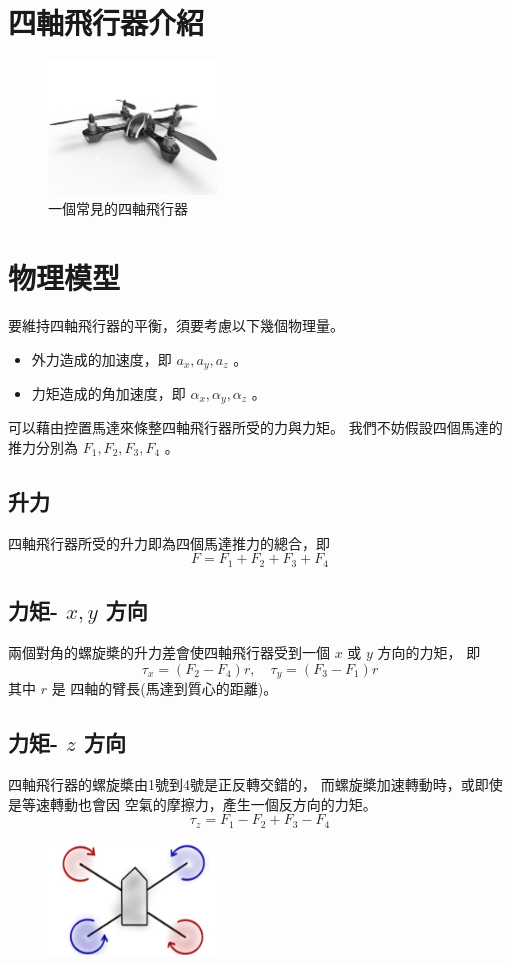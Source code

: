 \documentclass[12pt, a4paper]{article}
\begin{document}
\section{四軸飛行器介紹}
\begin{figure}[H]
  \centering
  \includegraphics[width=0.4\textwidth]{Figures/quadcopter.jpg}
\caption{一個常見的四軸飛行器}
\label{fig:}
\end{figure}

\section{物理模型}
要維持四軸飛行器的平衡，須要考慮以下幾個物理量。
\begin{itemize}
  \item 外力造成的加速度，即 $a_x, a_y, a_z$ 。 
  \item 力矩造成的角加速度，即 $\alpha_x, \alpha_y, \alpha_z$ 。 
\end{itemize}
可以藉由控置馬達來條整四軸飛行器所受的力與力矩。
我們不妨假設四個馬達的推力分別為 $F_1, F_2, F_3, F_4$ 。

\subsection{升力}
四軸飛行器所受的升力即為四個馬達推力的總合，即
 \[ F = F_1 + F_2 + F_3 + F_4 \]

\subsection{力矩- $x, y$ 方向}
兩個對角的螺旋槳的升力差會使四軸飛行器受到一個 $x$ 或 $y$ 方向的力矩，
即
\[ \tau_x = (F_2 - F_4) r, \quad \tau_y = (F_3 - F_1) r \]
其中 $r$ 是 四軸的臂長(馬達到質心的距離)。

\subsection{力矩- $z$ 方向}
四軸飛行器的螺旋槳由1號到4號是正反轉交錯的，
而螺旋槳加速轉動時，或即使是等速轉動也會因
空氣的摩擦力，產生一個反方向的力矩。
 \[ \tau_z = F_1 - F_2 + F_3 - F_4 \]
 \begin{figure}[H]
  \centering
  \includegraphics[width=0.4\textwidth]{Figures/prop-dir.jpg}
\caption{}
\label{fig:}
\end{figure}
\end{document}
